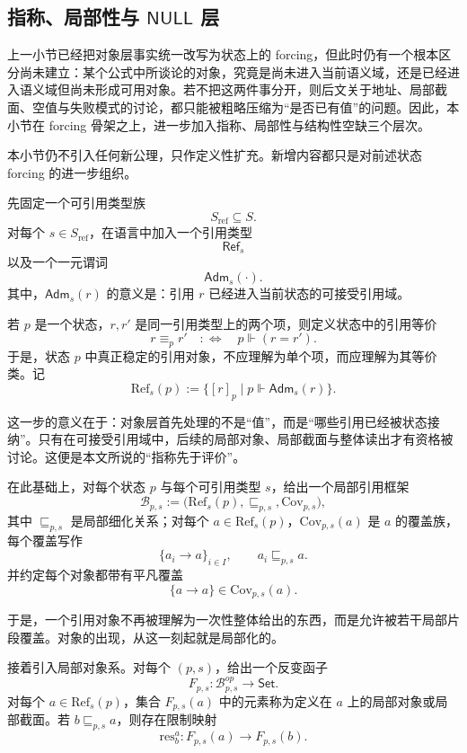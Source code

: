 \subsection{指称、局部性与 \texorpdfstring{$\mathsf{NULL}$}{NULL} 层}\label{subsec:logic-expansion-chain-ref-local-null}

上一小节已经把对象层事实统一改写为状态上的 forcing，但此时仍有一个根本区分尚未建立：某个公式中所谈论的对象，究竟是尚未进入当前语义域，还是已经进入语义域但尚未形成可用对象。若不把这两件事分开，则后文关于地址、局部截面、空值与失败模式的讨论，都只能被粗略压缩为“是否已有值”的问题。因此，本小节在 forcing 骨架之上，进一步加入指称、局部性与结构性空缺三个层次。

本小节仍不引入任何新公理，只作定义性扩充。新增内容都只是对前述状态 forcing 的进一步组织。

先固定一个可引用类型族
\[
S_{\mathrm{ref}}\subseteq S.
\]
对每个 \(s\in S_{\mathrm{ref}}\)，在语言中加入一个引用类型
\[
\mathsf{Ref}_s
\]
以及一个一元谓词
\[
\mathsf{Adm}_s(\cdot).
\]
其中，\(\mathsf{Adm}_s(r)\) 的意义是：引用 \(r\) 已经进入当前状态的可接受引用域。

若 \(p\) 是一个状态，\(r,r'\) 是同一引用类型上的两个项，则定义状态中的引用等价
\[
r\equiv_p r'
\quad:\Longleftrightarrow\quad
p\Vdash (r=r').
\]
于是，状态 \(p\) 中真正稳定的引用对象，不应理解为单个项，而应理解为其等价类。记
\[
\mathrm{Ref}_s(p)
:=
\{[r]_p\mid p\Vdash \mathsf{Adm}_s(r)\}.
\]

这一步的意义在于：对象层首先处理的不是“值”，而是“哪些引用已经被状态接纳”。只有在可接受引用域中，后续的局部对象、局部截面与整体读出才有资格被讨论。这便是本文所说的“指称先于评价”。

在此基础上，对每个状态 \(p\) 与每个可引用类型 \(s\)，给出一个局部引用框架
\[
\mathcal{B}_{p,s}
:=
\bigl(\mathrm{Ref}_s(p),\sqsubseteq_{p,s},\mathrm{Cov}_{p,s}\bigr),
\]
其中 \(\sqsubseteq_{p,s}\) 是局部细化关系；对每个 \(a\in \mathrm{Ref}_s(p)\)，\(\mathrm{Cov}_{p,s}(a)\) 是 \(a\) 的覆盖族，每个覆盖写作
\[
\{a_i\to a\}_{i\in I},
\qquad
a_i\sqsubseteq_{p,s} a.
\]
并约定每个对象都带有平凡覆盖
\[
\{a\to a\}\in \mathrm{Cov}_{p,s}(a).
\]

于是，一个引用对象不再被理解为一次性整体给出的东西，而是允许被若干局部片段覆盖。对象的出现，从这一刻起就是局部化的。

接着引入局部对象系。对每个 \((p,s)\)，给出一个反变函子
\[
F_{p,s}:\mathcal{B}_{p,s}^{op}\to \mathsf{Set}.
\]
对每个 \(a\in \mathrm{Ref}_s(p)\)，集合 \(F_{p,s}(a)\) 中的元素称为定义在 \(a\) 上的局部对象或局部截面。若 \(b\sqsubseteq_{p,s} a\)，则存在限制映射
\[
\mathrm{res}^{a}_{b}:F_{p,s}(a)\to F_{p,s}(b).
\]

